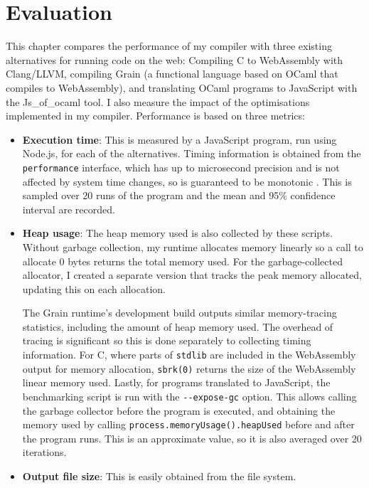 \chapter{Evaluation}
This chapter compares the performance of my compiler with three existing alternatives for running code on the web: Compiling C to WebAssembly with Clang/LLVM, compiling Grain (a functional language based on OCaml that compiles to WebAssembly), and translating OCaml programs to JavaScript with the Js\_of\_ocaml tool.
I also measure the impact of the optimisations implemented in my compiler. Performance is based on three metrics: 

\begin{itemize}
\item \textbf{Execution time}: This is measured by a JavaScript program, run using Node.js, for each of the alternatives. Timing information is obtained from the \verb|performance| interface, which has up to microsecond precision and is not affected by system time changes, so is guaranteed to be monotonic \cite{timing}. This is sampled over 20 runs of the program and the mean and 95\% confidence interval are recorded. 

\item \textbf{Heap usage}: The heap memory used is also collected by these scripts. Without garbage collection, my runtime allocates memory linearly so a call to allocate 0 bytes returns the total memory used. For the garbage-collected allocator, I created a separate version that tracks the peak memory allocated, updating this on each allocation. 

The Grain runtime's development build outputs similar memory-tracing statistics, including the amount of heap memory used. 
The overhead of tracing is significant so this is done separately to collecting timing information. For C, where parts of \verb|stdlib| are included in the WebAssembly output for memory allocation, \verb|sbrk(0)| returns the size of the WebAssembly linear memory used. %
Lastly, for programs translated to JavaScript, the benchmarking script is run with the \verb|--expose-gc| option. This allows calling the garbage collector before the program is executed, and obtaining the memory used by calling \verb|process.memoryUsage().heapUsed| before and after the program runs. This is an approximate value, so it is also averaged over 20 iterations.

\item \textbf{Output file size}: This is easily obtained from the file system.

\end{itemize}

